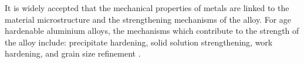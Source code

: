 	It is widely accepted that the mechanical properties of metals are linked to the material microstructure and the strengthening mechanisms of the alloy. For age hardenable aluminium alloys, the mechanisms which contribute to the strength of the alloy include: precipitate hardening, solid solution strengthening, work hardening, and grain size refinement \cite{Shercliff1990a}.
